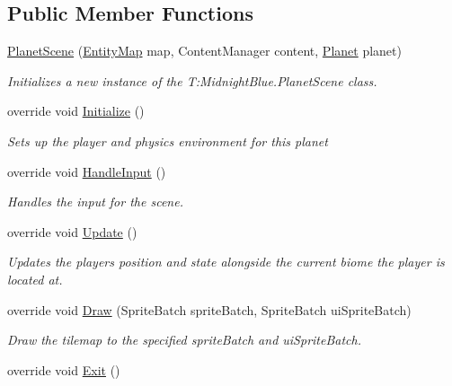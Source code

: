 \subsection*{Public Member Functions}
\begin{DoxyCompactItemize}
\item 
\hyperlink{class_midnight_blue_1_1_planet_scene_a50ee691836116a89ff549e519f895ba3}{Planet\+Scene} (\hyperlink{class_midnight_blue_1_1_engine_1_1_entity_component_1_1_entity_map}{Entity\+Map} map, Content\+Manager content, \hyperlink{class_midnight_blue_1_1_planet}{Planet} planet)
\begin{DoxyCompactList}\small\item\em Initializes a new instance of the T\+:\+Midnight\+Blue.\+Planet\+Scene class. \end{DoxyCompactList}\item 
override void \hyperlink{class_midnight_blue_1_1_planet_scene_ac8b7e88283b22b87aa45f116b549e86f}{Initialize} ()
\begin{DoxyCompactList}\small\item\em Sets up the player and physics environment for this planet \end{DoxyCompactList}\item 
override void \hyperlink{class_midnight_blue_1_1_planet_scene_a6c84a639f27b9f7510b514969d47d1bd}{Handle\+Input} ()
\begin{DoxyCompactList}\small\item\em Handles the input for the scene. \end{DoxyCompactList}\item 
override void \hyperlink{class_midnight_blue_1_1_planet_scene_add0a85b4f754f026231aa7269259c65c}{Update} ()
\begin{DoxyCompactList}\small\item\em Updates the players position and state alongside the current biome the player is located at. \end{DoxyCompactList}\item 
override void \hyperlink{class_midnight_blue_1_1_planet_scene_af22a201631e5f8c606ec3f7463635977}{Draw} (Sprite\+Batch sprite\+Batch, Sprite\+Batch ui\+Sprite\+Batch)
\begin{DoxyCompactList}\small\item\em Draw the tilemap to the specified sprite\+Batch and ui\+Sprite\+Batch. \end{DoxyCompactList}\item 
override void \hyperlink{class_midnight_blue_1_1_planet_scene_af3aab90a13294493e1f2cd29b0fb60e6}{Exit} ()

\end{DoxyCompactItemize}

